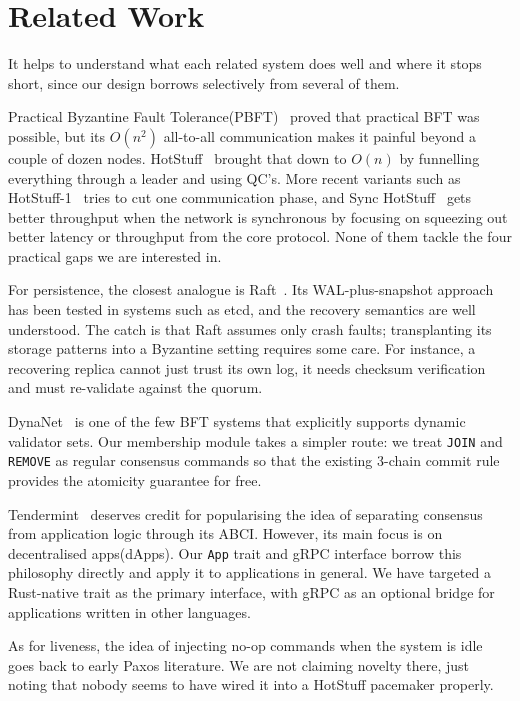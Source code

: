 \documentclass{SVProc}
\begin{document}
\section{Related Work}
\label{sec:related_work}

It helps to understand what each related system does well and where it
stops short, since our design borrows selectively from several of them.

Practical Byzantine Fault Tolerance(PBFT)~\cite{pbft1999} proved that practical BFT was possible, but its $O(n^2)$ all-to-all communication makes it painful beyond a couple of dozen nodes.  HotStuff~\cite{hotstuff2019} brought that down to $O(n)$ by funnelling everything through a leader and using QC's.  More recent variants such as HotStuff-1~\cite{hotstuff1_2024} tries to cut one communication phase, and Sync HotStuff~\cite{synchotstuff2020} gets better throughput when the network is synchronous by focusing on squeezing
out better latency or throughput from the core protocol. None of them tackle the four practical gaps we are interested in.

For persistence, the closest analogue is Raft~\cite{raft2014}.  Its WAL-plus-snapshot approach has been tested in systems such as etcd, and the recovery semantics are well understood. The catch is that Raft assumes only crash faults; transplanting its storage patterns into a Byzantine setting requires some care. For instance, a recovering replica cannot just trust its own log, it needs checksum verification and must re-validate against the quorum.

DynaNet~\cite{dynanet2025} is one of the few BFT systems that
explicitly supports dynamic validator sets.  Our membership module takes a simpler route: we treat \texttt{JOIN} and \texttt{REMOVE} as regular consensus commands so that the existing 3-chain commit rule provides the atomicity guarantee for free.

Tendermint~\cite{tendermint} deserves credit for popularising the idea of separating consensus from application logic through its ABCI. However, its main focus is on decentralised apps(dApps). Our \texttt{App} trait and gRPC interface borrow this philosophy directly and apply it to applications in general. We have targeted a Rust-native trait as the primary interface, with gRPC as an optional bridge for applications written in other languages.

As for liveness, the idea of injecting no-op commands when the system is idle goes back to early Paxos literature. We are not claiming novelty there, just noting that nobody seems to have wired it into a HotStuff pacemaker properly.
\end{document}
